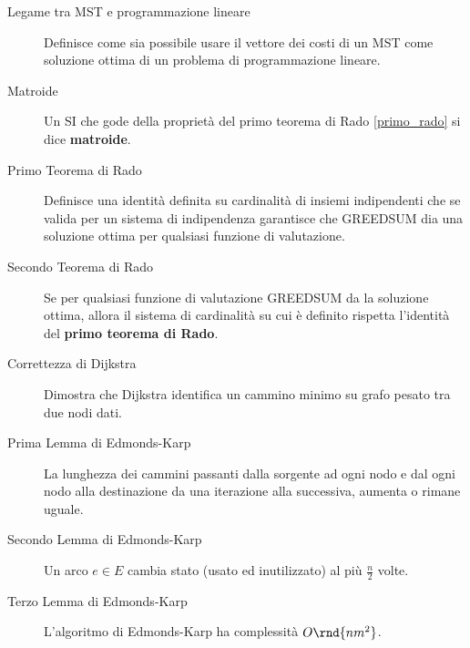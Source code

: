 \documentclass[\main/main.tex]{subfiles}
\begin{document}
\begin{multicols}{2}
\begin{description}
		\item[Legame tra MST e programmazione lineare] Definisce come sia possibile usare il vettore dei costi di un MST come soluzione ottima di un problema di programmazione lineare.
		\item[Matroide] Un SI che gode della proprietà del primo teorema di Rado \ref{primo_rado} si dice \textbf{matroide}.
		\item[Primo Teorema di Rado] Definisce una identità definita su cardinalità di insiemi indipendenti che se valida per un sistema di indipendenza garantisce che GREEDSUM dia una soluzione ottima per qualsiasi funzione di valutazione.
		\item[Secondo Teorema di Rado] Se per qualsiasi funzione di valutazione GREEDSUM da la soluzione ottima, allora il sistema di cardinalità su cui è definito rispetta l'identità del \textbf{primo teorema di Rado}.
		\item[Correttezza di Dijkstra] Dimostra che Dijkstra identifica un cammino minimo su grafo pesato tra due nodi dati.
		\item[Prima Lemma di Edmonds-Karp] La lunghezza dei cammini passanti dalla sorgente ad ogni nodo e dal ogni nodo alla destinazione da una iterazione alla successiva, aumenta o rimane uguale.
		\item[Secondo Lemma di Edmonds-Karp] Un arco \(e \in E\) cambia stato (usato ed inutilizzato) al più \(\frac{n}{2}\) volte.
		\item[Terzo Lemma di Edmonds-Karp] L'algoritmo di Edmonds-Karp ha complessità \(O\rnd{nm^2}\).
	\end{description}
\end{multicols}
\end{document}
